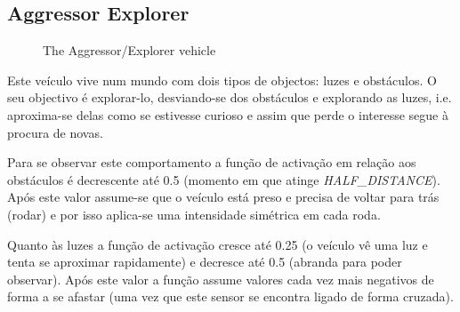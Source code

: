 \documentclass[a4paper]{article}
\begin{document}
\subsection{Aggressor Explorer}
\begin{figure}[h]
	\centering
	
	\caption{The Aggressor/Explorer vehicle}
\end{figure}

Este veículo vive num mundo com dois tipos de objectos: luzes e obstáculos.
O seu objectivo é explorar-lo, desviando-se dos obstáculos e explorando as luzes, i.e.
aproxima-se delas como se estivesse curioso e assim que perde o interesse segue à procura de novas.

Para se observar este comportamento a função de activação em relação aos obstáculos é decrescente até 0.5 (momento em que atinge \emph{HALF\_DISTANCE}).
Após este valor assume-se que o veículo está preso e precisa de voltar para trás (rodar) e por isso aplica-se uma intensidade simétrica em cada roda.

Quanto às luzes a função de activação cresce até 0.25 (o veículo vê uma luz e tenta se aproximar rapidamente) e decresce até 0.5 (abranda para poder observar).
Após este valor a função assume valores cada vez mais negativos de forma a se afastar (uma vez que este sensor se encontra ligado de forma cruzada).

\cleardoublepage
\end{document}
